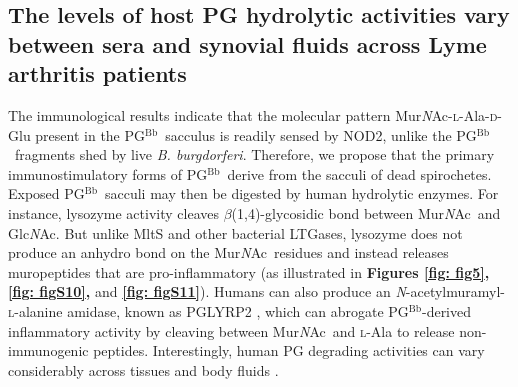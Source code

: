 \documentclass[twoside, watermark]{zHenriquesLab-StyleBioRxiv}
\newcommand{\pgbb}{PG$^\text{Bb}$}
\newcommand{\NAM}{Mur\textit{N}Ac}
\newcommand{\NAG}{Glc\textit{N}Ac}
\newcommand{\scl}{\textsc{l}} %
\newcommand{\scd}{\textsc{d}} %
\begin{document}
\subsection*{The levels of host PG hydrolytic activities vary between sera and synovial fluids across Lyme arthritis patients}
The immunological results indicate that the molecular pattern \NAM-\scl-Ala-\scd-Glu present in the \pgbb~sacculus is readily sensed by NOD2, unlike the \pgbb~fragments shed by live \textit{B. burgdorferi}. Therefore, we propose that the primary immunostimulatory forms of \pgbb~derive from the sacculi of dead spirochetes. Exposed \pgbb~sacculi may then be digested by human hydrolytic enzymes. For instance, lysozyme activity cleaves $\beta$(1,4)-glycosidic bond between \NAM~and \NAG. But unlike MltS and other bacterial LTGases, lysozyme does not produce an anhydro bond on the \NAM~residues and instead releases muropeptides that are pro-inflammatory (as illustrated in \textbf{Figures \ref{fig: fig5}, \ref{fig: figS10},} and \textbf{\ref{fig: figS11}}). Humans can also produce an \textit{N}-acetylmuramyl-\scl-alanine amidase, known as PGLYRP2 \cite{Dziarski2010}, which can abrogate \pgbb-derived inflammatory activity by cleaving between \NAM~and \scl-Ala to release non-immunogenic peptides. Interestingly, human PG degrading activities can vary considerably across tissues and body fluids \cite{Vanderwinkel1995}. 
\end{document}
